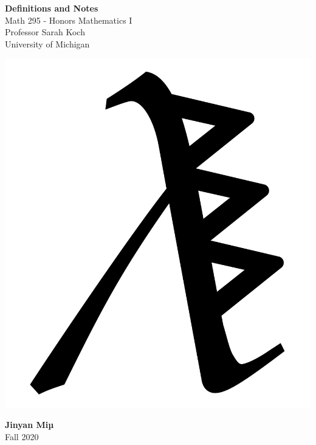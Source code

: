 \documentclass[11pt]{article}
\begin{document}
	\begin{titlepage}
		\begin{center}
			\vspace*{\fill}
			\Huge \color{red}
				\textbf{Definitions and Notes}\\
			\vspace{0.5cm}			
			\Large \color{black}
				Math 295 - Honors Mathematics I\\
				Professor Sarah Koch\\		
				University of Michigan\\
			\vspace{3cm}
			
			\includegraphics[scale=0.19]{spikyLambdaPazo.pdf}
			
			\vspace{5cm}
			\LARGE
				\textbf{Jinyan Miµ}\\
				Fall 2020\\
			\vspace{5cm}

		\vspace*{\fill}
		\end{center}			
	\end{titlepage}
\end{document}
